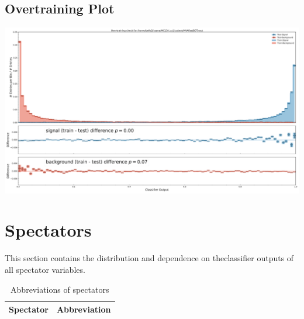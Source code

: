 \documentclass[10pt,a4paper]{article}
\begin{document}
\subsection{Overtraining Plot}
\begin{center}
\includegraphics[width=1.0\textwidth]{overtraining_plot_-2246559386340646363.pdf}
\end{center}
\raggedbottom
\pagebreak[0]
\FloatBarrier
\section{Spectators}
This section contains the distribution and dependence on theclassifier outputs of all spectator variables.\begin{center}
\begin{longtable}{ll}
\caption{Abbreviations of spectators}\\
\toprule
Spectator & Abbreviation\\
\midrule
\bottomrule
\end{longtable}
\end{center}
\end{document}
